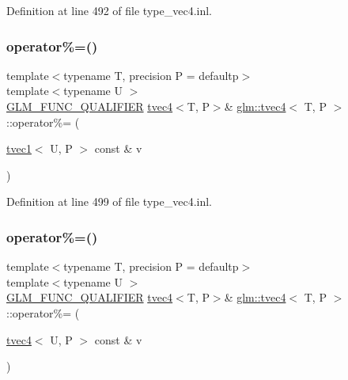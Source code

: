 Definition at line 492 of file type\+\_\+vec4.\+inl.

\mbox{\label{structglm_1_1tvec4_abf42924fdc633b087a0bb2d91830fbce}} 
\subsubsection{\texorpdfstring{operator\%=()}{operator\%=()}\hspace{0.1cm}{\footnotesize\ttfamily [5/6]}}
{\footnotesize\ttfamily template$<$typename T, precision P = defaultp$>$ \\
template$<$typename U $>$ \\
\mbox{\hyperlink{setup_8hpp_a33fdea6f91c5f834105f7415e2a64407}{G\+L\+M\+\_\+\+F\+U\+N\+C\+\_\+\+Q\+U\+A\+L\+I\+F\+I\+ER}} \mbox{\hyperlink{structglm_1_1tvec4}{tvec4}}$<$T, P$>$\& \mbox{\hyperlink{structglm_1_1tvec4}{glm\+::tvec4}}$<$ T, P $>$\+::operator\%= (\begin{DoxyParamCaption}\item[{\mbox{\hyperlink{structglm_1_1tvec1}{tvec1}}$<$ U, P $>$ const \&}]{v }\end{DoxyParamCaption})}



Definition at line 499 of file type\+\_\+vec4.\+inl.

\mbox{\label{structglm_1_1tvec4_a03faa16c94b7cb1e2082aebede1451c2}} 
\subsubsection{\texorpdfstring{operator\%=()}{operator\%=()}\hspace{0.1cm}{\footnotesize\ttfamily [6/6]}}
{\footnotesize\ttfamily template$<$typename T, precision P = defaultp$>$ \\
template$<$typename U $>$ \\
\mbox{\hyperlink{setup_8hpp_a33fdea6f91c5f834105f7415e2a64407}{G\+L\+M\+\_\+\+F\+U\+N\+C\+\_\+\+Q\+U\+A\+L\+I\+F\+I\+ER}} \mbox{\hyperlink{structglm_1_1tvec4}{tvec4}}$<$T, P$>$\& \mbox{\hyperlink{structglm_1_1tvec4}{glm\+::tvec4}}$<$ T, P $>$\+::operator\%= (\begin{DoxyParamCaption}\item[{\mbox{\hyperlink{structglm_1_1tvec4}{tvec4}}$<$ U, P $>$ const \&}]{v }\end{DoxyParamCaption})}



